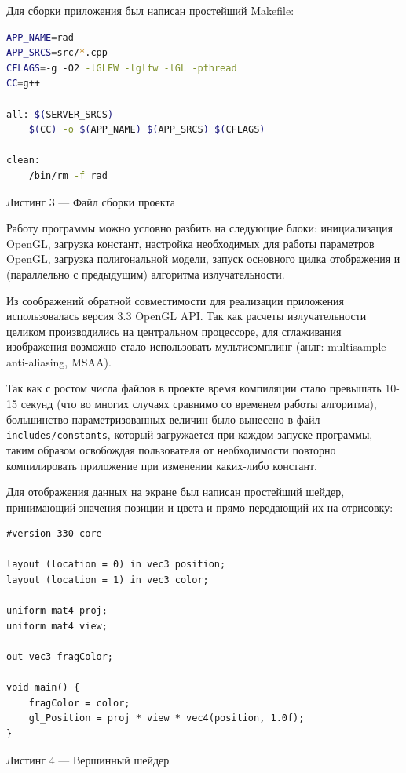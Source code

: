 \documentclass[12pt]{article}
\begin{document}
Для сборки приложения был написан простейший Makefile:
\begin{lstlisting}[language=Bash]
APP_NAME=rad
APP_SRCS=src/*.cpp
CFLAGS=-g -O2 -lGLEW -lglfw -lGL -pthread
CC=g++

all: $(SERVER_SRCS)
	$(CC) -o $(APP_NAME) $(APP_SRCS) $(CFLAGS)

clean:
	/bin/rm -f rad
\end{lstlisting}
\begin{center}Листинг 3 --- Файл сборки проекта\end{center}

Работу программы можно условно разбить на следующие блоки: инициализация OpenGL, загрузка констант, настройка необходимых для работы параметров OpenGL, загрузка полигональной модели, запуск основного цилка отображения и (параллельно с предыдущим) алгоритма излучательности.

Из соображений обратной совместимости для реализации приложения использовалась версия 3.3 OpenGL API. Так как расчеты излучательности целиком производились на центральном процессоре, для сглаживания изображения возможно стало использовать мультисэмплинг (анлг: multisample anti-aliasing, MSAA). 

Так как с ростом числа файлов в проекте время компиляции стало превышать 10-15 секунд (что во многих случаях сравнимо со временем работы алгоритма), большинство параметризованных величин было вынесено в файл \texttt{includes/constants}, который загружается при каждом запуске программы, таким образом освобождая пользователя от необходимости повторно компилировать приложение при изменении каких-либо констант.

Для отображения данных на экране был написан простейший шейдер, принимающий значения позиции и цвета и прямо передающий их на отрисовку:
\begin{lstlisting}
#version 330 core

layout (location = 0) in vec3 position;
layout (location = 1) in vec3 color;

uniform mat4 proj;
uniform mat4 view;

out vec3 fragColor;

void main() {
    fragColor = color;
    gl_Position = proj * view * vec4(position, 1.0f);
}
\end{lstlisting}
\begin{center}Листинг 4 --- Вершинный шейдер\end{center}
\end{document}
